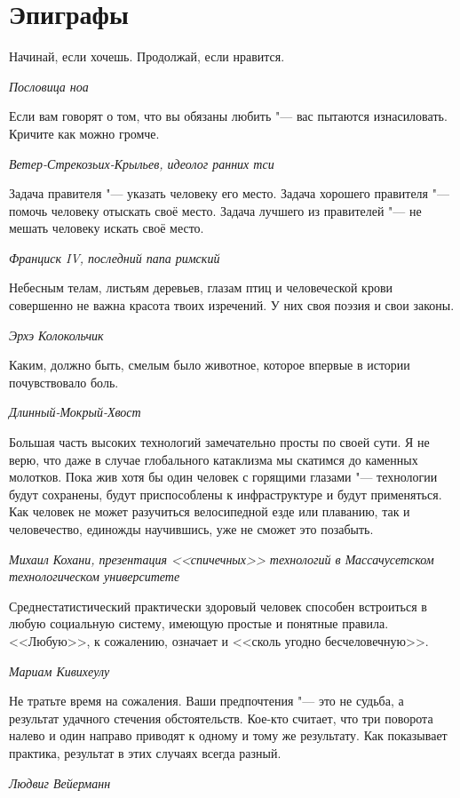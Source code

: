 \documentclass[a4paper,10pt]{book}
\newcommand{\mulang}[3]{#2}%
\begin{document}
 \tableofcontents

 
 
\chapter{Эпиграфы}

\epigraph{\mulang{}{Начинай, если хочешь.}
{Begin if you want.}
\mulang{}{Продолжай, если нравится.}
{Continue if you like.}}
{\textit{Пословица ноа}}

\epigraph{Если вам говорят о том, что вы обязаны любить "--- вас пытаются изнасиловать.
Кричите как можно громче.}
{\textit{Ветер-Стрекозьих-Крыльев, идеолог ранних тси}}

\epigraph{Задача правителя "--- указать человеку его место.
Задача хорошего правителя "--- помочь человеку отыскать своё место.
Задача лучшего из правителей "--- не мешать человеку искать своё место.}
{\textit{Франциск IV, последний папа римский}}

\epigraph{Небесным телам, листьям деревьев, глазам птиц и человеческой крови совершенно не важна красота твоих изречений.
У них своя поэзия и свои законы.}
{\textit{Эрхэ Колокольчик}}

\epigraph{Каким, должно быть, смелым было животное, которое впервые в истории почувствовало боль.}
{\textit{Длинный-Мокрый-Хвост}}

\epigraph{Большая часть высоких технологий замечательно просты по своей сути.
Я не верю, что даже в случае глобального катаклизма мы скатимся до каменных молотков.
Пока жив хотя бы один человек с горящими глазами "--- технологии будут сохранены, будут приспособлены к инфраструктуре и будут применяться.
Как человек не может разучиться велосипедной езде или плаванию, так и человечество, единожды научившись, уже не сможет это позабыть.}
{\textit{Михаил Кохани, презентация <<спичечных>> технологий в Массачусетском технологическом университете}}

\epigraph{Среднестатистический практически здоровый человек способен встроиться в любую социальную систему, имеющую простые и понятные правила.
<<Любую>>, к сожалению, означает и <<сколь угодно бесчеловечную>>.}
{\textit{Мариам Кивихеулу}}

\epigraph{Не тратьте время на сожаления.
Ваши предпочтения "--- это не судьба, а результат удачного стечения обстоятельств.
Кое-кто считает, что три поворота налево и один направо приводят к одному и тому же результату.
Как показывает практика, результат в этих случаях всегда разный.}
{\textit{Людвиг Вейерманн}}
\end{document}

